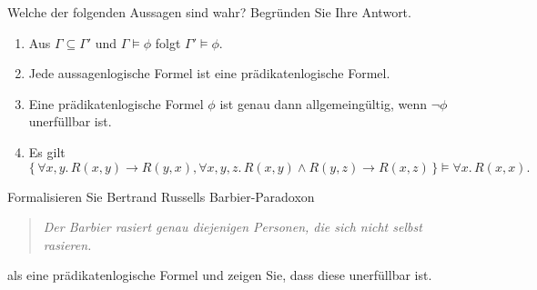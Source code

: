 \documentclass[german]{latteachCD}[2017/03/28]
\begin{document}
\begin{exercise}
  Welche der folgenden Aussagen sind wahr?  Begründen Sie Ihre Antwort.
  \begin{enumerate}
  \item Aus $\Gamma \subseteq \Gamma'$ und $\Gamma \models \phi$ folgt $\Gamma'
    \models \phi$.
  \item Jede aussagenlogische Formel ist eine prädikatenlogische Formel.
  \item Eine prädikatenlogische Formel $\phi$ ist genau dann allgemeingültig,
    wenn $\lnot \phi$ unerfüllbar ist.
  \item Es gilt
    \begin{equation*}
      \{\,\forall x, y.\, R(x,y) \to R(y,x), \forall x, y, z.\, R(x,y) \land R(y,z)
      \to R(x,z)\,\} \models \forall x.\, R(x,x).
    \end{equation*}
  \end{enumerate}
\end{exercise}

\begin{exercise}
  Formalisieren Sie Bertrand Russells Barbier-Paradoxon
  \begin{quote}
    \emph{Der Barbier rasiert genau diejenigen Personen, die sich nicht selbst rasieren.}
  \end{quote}
  als eine prädikatenlogische Formel und zeigen Sie, dass diese unerfüllbar ist.
\end{exercise}
\end{document}
